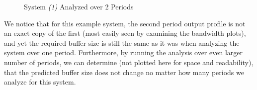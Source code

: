 \begin{figure}[ht!]
  \centering
  \caption{System \emph{(1)} Analyzed over 2 Periods}
  \label{fig:2_period_system_1}
\end{figure}

We notice that for this example system, the second period output
profile is not an exact copy of the first (most easily seen by
examining the bandwidth plots), and yet the required buffer size is
still the same as it was when analyzing the system over one period.
Furthermore, by running the analysis over even larger number of
periods, we can determine (not plotted here for space and
readability), that the predicted buffer size does not change no matter
how many periods we analyze for this system.

